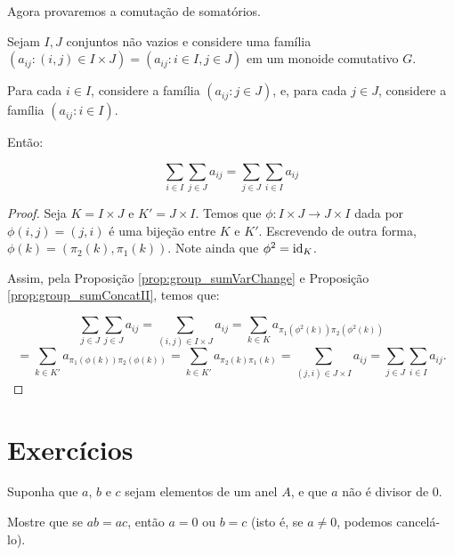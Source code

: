 Agora provaremos a comutação de somatórios.

\begin{prop}\label{prop:group_sumCommut}
    Sejam $I, J$ conjuntos não vazios e considere uma família $(a_{ij}:(i, j)\in I\times J)=(a_{ij}:i \in I, j \in J)$ em um monoide comutativo $G$.

    Para cada $i \in I$, considere a família $(a_{ij}: j \in J)$, e, para cada $j \in J$, considere a família $(a_{ij}: i \in I)$.

    Então:

    \[\sum_{i\in I}\sum_{j \in J}a_{ij}=\sum_{j \in J}\sum_{i \in I}a_{ij}\]
\end{prop}
\begin{proof}
    Seja $K=I\times J$ e $K'=J\times I$.
    Temos que $\phi:I\times J\rightarrow J\times I$ dada por $\phi(i, j)=(j, i)$ é uma bijeção entre $K$ e $K'$. Escrevendo de outra forma, $\phi(k)=(\pi_2(k), \pi_1(k))$. Note ainda que $\phi^2=\operatorname{id}_K$.

    Assim, pela Proposição \ref{prop:group_sumVarChange} e Proposição \ref{prop:group_sumConcatII}, temos que:

    \[\sum_{j\in J}\sum_{j \in J}a_{ij}=\sum_{(i,j)\in I\times J}a_{ij}=\sum_{k\in K}a_{\pi_1(\phi^2(k))\pi_2(\phi^2(k))}\]
    \[=\sum_{k \in K'}a_{\pi_1(\phi(k))\pi_2(\phi(k))}=\sum_{k \in K'}a_{\pi_2(k)\pi_1(k)}=\sum_{(j, i)\in J\times I}a_{ij}=\sum_{j \in J}\sum_{i \in I}a_{ij}.\]

\end{proof}

\section{Exercícios}
\begin{exer}
    Suponha que $a$, $b$ e $c$ sejam elementos de um anel $A$, e que $a$ não é divisor de $0$.
    
    Mostre que se $ab = ac$, então $a = 0$ ou $b = c$ (isto é, se $a\neq 0$, podemos cancelá-lo).
\end{exer}

